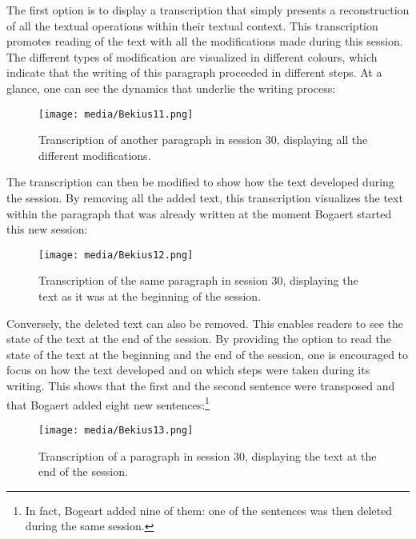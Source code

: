 \begin{paper}
The first option is to display a transcription that simply presents a
reconstruction of all the textual operations within their textual
context. This transcription promotes reading of the text with all the
modifications made during this session. The different types of
modification are visualized in different colours, which indicate that
the writing of this paragraph proceeded in different steps. At a glance,
one can see the dynamics that underlie the writing process:

\begin{figure}[H]
    \centering
    \texttt{[image: media/Bekius11.png]}
    \caption{Transcription of another paragraph in session 30, displaying all the different modifications.}
    \label{fig:bekius:latenfull}
\end{figure}

\noindent
The transcription can then be modified to show how the text developed
during the session. By removing all the added text, this transcription
visualizes the text within the paragraph that was already written at the
moment Bogaert started this new session:


\begin{figure}[H]
    \centering
    \texttt{[image: media/Bekius12.png]}
    \caption{Transcription of the same paragraph in session 30, displaying the text as it was at the beginning of the session.}
    \label{fig:bekius:latenstart}
\end{figure}

\noindent Conversely, the deleted text can also be removed. This enables readers
to see the state of the text at the end of the session. By providing the
option to read the state of the text at the beginning and the end of the
session, one is encouraged to focus on how the text developed and on which
steps were taken during its writing. This shows that the first and the second
sentence were transposed and that Bogaert added eight new sentences:\footnote{In
fact, Bogeart added nine of them: one of the sentences was then deleted during the same
session.}

\begin{figure}[H]
    \centering
    \texttt{[image: media/Bekius13.png]}
    \caption{Transcription of a paragraph in session 30, displaying the
text at the end of the session.}
    \label{fig:bekius:latenstop}
\end{figure}


\end{paper}
